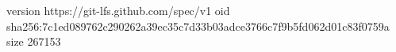 version https://git-lfs.github.com/spec/v1
oid sha256:7c1ed089762c290262a39ec35c7d33b03adce3766c7f9b5fd062d01c83f0759a
size 267153

